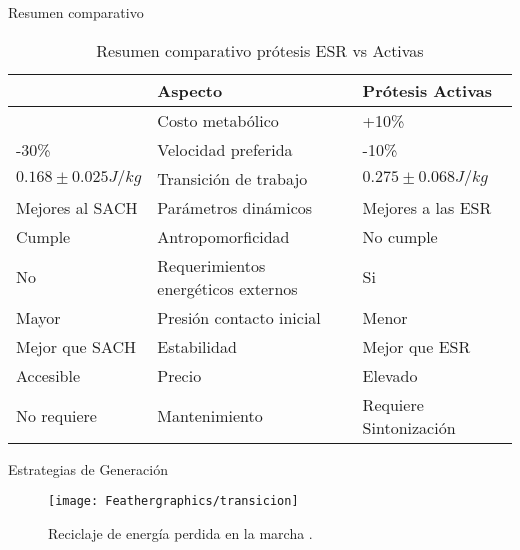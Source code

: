 \documentclass[10pt]{beamer}
\begin{document}
\begin{frame}{Resumen comparativo}
\begin{table}
\begin{centering}
\caption{Resumen comparativo prótesis ESR vs Activas}
\begin{tabular}{|>{\centering}p{24mm}|>{\centering}p{45mm}|>{\centering}p{24mm}|}
\hline 
{\footnotesize{}Prótesis ESR} & {\footnotesize{}Aspecto} & {\footnotesize{}Prótesis Activas}\tabularnewline
\hline 
\hline 
{\footnotesize{}+25\%} & {\footnotesize{}Costo metabólico} & {\footnotesize{}+10\%}\tabularnewline
\hline 
{\footnotesize{}-30\%} & {\footnotesize{}Velocidad preferida} & {\footnotesize{}-10\%}\tabularnewline
\hline 
{\footnotesize{}$0.168 \pm 0.025 J/kg$} & {\footnotesize{}Transición de trabajo} & {\footnotesize{}$0.275 \pm 0.068 J/kg$}\tabularnewline
\hline 
{\footnotesize{}Mejores al SACH} & {\footnotesize{}Parámetros dinámicos} & {\footnotesize{}Mejores a las ESR}\tabularnewline
\hline 
{\footnotesize{}Cumple} & {\footnotesize{}Antropomorficidad} & {\footnotesize{}No cumple}\tabularnewline
\hline 
{\footnotesize{}No} & {\footnotesize{}Requerimientos energéticos externos} & {\footnotesize{}Si}\tabularnewline
\hline 
{\footnotesize{}Mayor} & {\footnotesize{}Presión contacto inicial} & {\footnotesize{}Menor}\tabularnewline
\hline 
{\footnotesize{}Mejor que SACH} & {\footnotesize{}Estabilidad} & {\footnotesize{}Mejor que ESR}\tabularnewline
\hline 
{\footnotesize{}Accesible} & {\footnotesize{}Precio} & {\footnotesize{}Elevado}\tabularnewline
\hline 
{\footnotesize{}No requiere} & {\footnotesize{}Mantenimiento} & {\footnotesize{}Requiere Sintonización}\tabularnewline
\hline 
\end{tabular}
\par\end{centering}


\end{table}

\end{frame}

\begin{frame}{Estrategias de Generación}

\begin{figure}
\begin{centering}
\texttt{[image: Feathergraphics/transicion]}
\par\end{centering}
\caption{Reciclaje de energía perdida en la marcha \cite{Collins2010}.}

\end{figure}
\end{frame}
\end{document}
